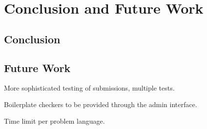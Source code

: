 \chapter{Conclusion and Future Work}

\section{Conclusion}

\section{Future Work}

More sophisticated testing of submissions, multiple tests.

Boilerplate checkers to be provided through the admin interface.

Time limit per problem language.
